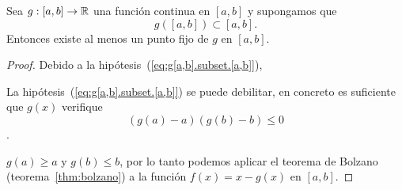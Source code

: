 \begin{proposition}
  \label{pro:existencia-punto-fijo}
  Sea $g:[a,b]\to\operatorname{{\mathbb R}}$ una función continua en $[a,b]$ y supongamos
  que
  \begin{equation}
    g([a,b])\subset [a,b].
    \label{eq:g[a,b].subset.[a,b]}
  \end{equation}
  Entonces existe al menos un punto fijo de $g$ en $[a,b]$.
\end{proposition}
\begin{proof}
  Debido a la hipótesis~(\ref{eq:g[a,b].subset.[a,b]}),
  \begin{extension}
    La hipótesis~(\ref{eq:g[a,b].subset.[a,b]}) se puede debilitar, en
    concreto es suficiente que $g(x)$ verifique
    $$(g(a)-a)(g(b)-b)\le 0$$.
  \end{extension}
  $g(a)\ge a$ y
  $g(b)\le b$, por lo tanto podemos aplicar el teorema de Bolzano
  (teorema~\ref{thm:bolzano}) a la función $f(x)=x-g(x)$ en $[a,b]$.
\end{proof}






